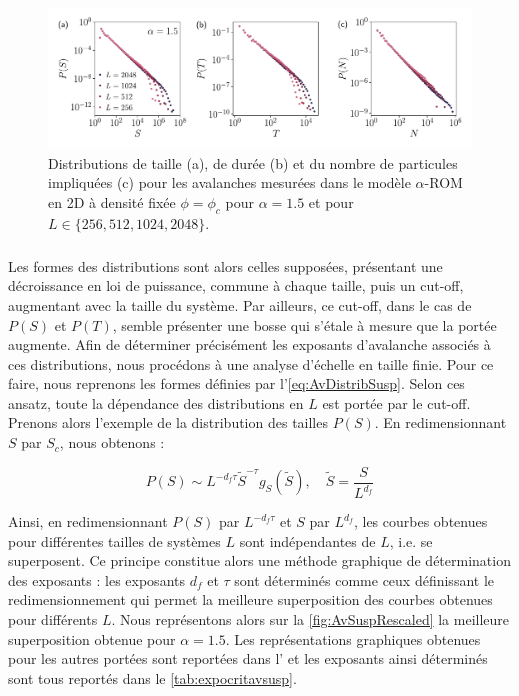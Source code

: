 \begin{figure}[h]
	\centering
	\includegraphics[width=\textwidth]{Chapitre3/Figures/Avalanches/Av_alpha15_edited.pdf}
	\caption{Distributions de taille (a), de durée (b) et du nombre de particules impliquées (c) pour les avalanches mesurées dans le modèle $\alpha$-ROM en 2D à densité fixée $\phi=\phi_c$ pour $\alpha = 1.5$ et pour $L \in \{ 256, 512, 1024, 2048 \}$.}
	\label{fig:AvSuspNotRescaled}
\end{figure}

\subparagraph{}Les formes des distributions sont alors celles supposées, présentant une décroissance en loi de puissance, commune à chaque taille, puis un cut-off, augmentant avec la taille du système. Par ailleurs, ce cut-off, dans le cas de $P(S)$ et $P(T)$, semble présenter une bosse qui s'étale à mesure que la portée augmente. Afin de déterminer précisément les exposants d'avalanche associés à ces distributions, nous procédons à une analyse d'échelle en taille finie. Pour ce faire, nous reprenons les formes définies par l'\autoref{eq:AvDistribSusp}. Selon ces ansatz, toute la dépendance des distributions en $L$ est portée par le cut-off. Prenons alors l'exemple de la distribution des tailles $P(S)$. En redimensionnant $S$ par $S_c$, nous obtenons :

\begin{equation}
	P(S) \sim L^{-d_f\tau}\tilde{S}^{-\tau}g_S\left( \tilde{S} \right),  \quad \tilde{S} = \frac{S}{L^{d_f}}
\end{equation}

\noindent Ainsi, en redimensionnant $P(S)$ par $L^{-d_f\tau}$ et $S$ par $L^{d_f}$, les courbes obtenues pour différentes tailles de systèmes $L$ sont indépendantes de $L$, i.e. se superposent. Ce principe constitue alors une méthode graphique de détermination des exposants : les exposants $d_f$ et $\tau$ sont déterminés comme ceux définissant le redimensionnement qui permet la meilleure superposition des courbes obtenues pour différents $L$. Nous représentons alors sur la \autoref{fig:AvSuspRescaled} la meilleure superposition obtenue pour $\alpha = 1.5$. Les représentations graphiques obtenues pour les autres portées sont reportées dans l' et les exposants ainsi déterminés sont tous reportés dans le \autoref{tab:expocritavsusp}.

